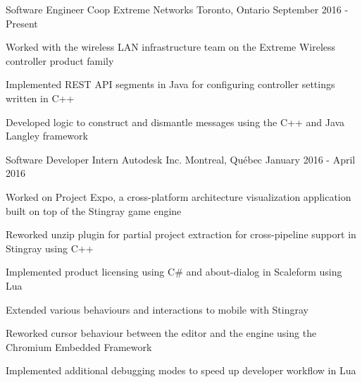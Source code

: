 


\begin{cventries}


\cventry
{Software Engineer Coop}
{Extreme Networks}
{Toronto, Ontario}
{September 2016 - Present}
{ %
Worked with the wireless LAN infrastructure team on the Extreme Wireless controller product family
\begin{cvitems}
\item[]
\item {Implemented REST API segments in Java for configuring controller settings written in C++}
\item {Developed logic to construct and dismantle messages using the C++ and Java Langley framework}
\end{cvitems}
}


\cventry
{Software Developer Intern}
{Autodesk Inc.}
{Montreal, Québec}
{January 2016 - April 2016}
{ %
Worked on Project Expo, a cross-platform architecture visualization application built on top of the Stingray game engine
\begin{cvitems}
\item[]
\item {Reworked unzip plugin for partial project extraction for cross-pipeline support in Stingray using C++}
\item {Implemented product licensing using C\# and about-dialog in Scaleform using Lua}
\item {Extended various behaviours and interactions to mobile with Stingray}
\item {Reworked cursor behaviour between the editor and the engine using the Chromium Embedded Framework}
\item {Implemented additional debugging modes to speed up developer workflow in Lua}
\end{cvitems}
}


\end{cventries}
